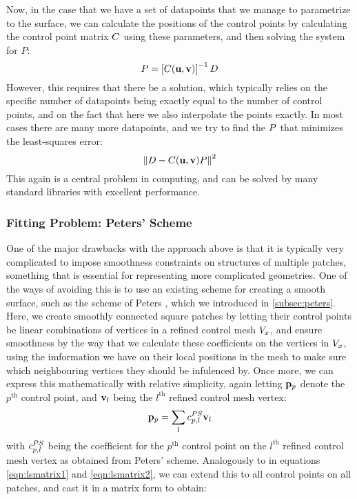 Now, in the case that we have a set of datapoints that we manage to parametrize to the surface, we can calculate the positions of the control points by calculating the control point matrix $\lsControlPointCoefMatrix$ using these parameters, and then solving the system for $P$:
\begin{equation*}
\lsControlPointMatrix = \left[\lsControlPointCoefMatrix(\vec{u},\vec{v})\right]^{-1}\lsDataPointMatrix
\end{equation*}
However, this requires that there be a solution, which typically relies on the specific number of datapoints being exactly equal to the number of control points, and on the fact that here we also interpolate the points exactly. In most cases there are many more datapoints, and we try to find the $\lsControlPointMatrix$ that minimizes the least-squares error:
\begin{equation}
\norm{\lsDataPointMatrix - \lsControlPointCoefMatrix(\vec{u},\vec{v})\lsControlPointMatrix}^2
\label{eqn:lsminim}
\end{equation}
This again is a central problem in computing, and can be solved by many standard libraries with excellent performance.

\subsubsection{Fitting Problem: Peters' Scheme}
\label{subsub:petersleastsq}
One of the major drawbacks with the approach above is that it is typically very complicated to impose smoothness constraints on structures of multiple patches, something that is essential for representing more complicated geometries. One of the ways of avoiding this is to use an existing scheme for creating a smooth surface, such as the scheme of Peters \cite{peters1992constructing,eck1996automatic}, which we introduced in \autoref{subsec:peters}. Here, we create smoothly connected square \Bez patches by letting their control points be linear combinations of vertices in a refined control mesh $\petersPatchPoints$, and ensure smoothness by the way that we calculate these coefficients on the vertices in $\petersPatchPoints$, using the imformation we have on their local positions in the mesh to make sure which neighbouring vertices they should be infulenced by. Once more, we can express this mathematically with relative simplicity, again letting $\lsControlPointi{p}$ denote the $p^\text{th}$ control point, and $\petersPatchPointVec_l$ being the $l^\text{th}$ refined control mesh vertex:
\begin{equation}
\lsControlPointi{p} = \sum\limits_{l} \petersControlPointCoef_{p,l} \petersPatchPointVec_l
\end{equation} 
with $\petersControlPointCoef_{p,l}$ being the coefficient for the $p^\text{th}$ \Bez control point on the $l^\text{th}$ refined control mesh vertex as obtained from Peters' scheme. Analogously to in equations \ref{eqn:lsmatrix1} and \ref{eqn:lsmatrix2}, we can extend this to all \Bez control points on all patches, and cast it in a matrix form to obtain:


